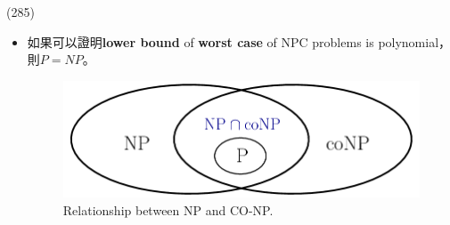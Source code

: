 \item \begin{theorem}{(285)} \quad\quad
    \begin{itemize}
        \item 如果可以證明\textbf{lower bound} of \textbf{worst case} of NPC problems is polynomial，則$P=NP$。
        \begin{figure}[H]
            \centering
            \includegraphics[scale=0.4]{img/np-conp.png}
            \caption{Relationship between NP and CO-NP.}
            \label{img:np-conp}
        \end{figure}
    \end{itemize}
\end{theorem}
